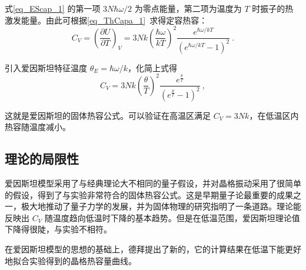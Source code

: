 式\autoref{eq_EScap_1} 的第一项 $3N \hbar\omega/2$ 为零点能量，第二项为温度为 $T$ 时振子的热激发能量。由此可根据\autoref{eq_ThCapa_1}~求得定容热容：
\begin{equation}
C_V=\left(\frac{\partial U}{\partial T}\right)_V=3Nk\left(\frac{\hbar \omega}{kT}\right)^2\frac{e^{\hbar \omega/kT}}{(e^{\hbar \omega/kT}-1)^2}~.
\end{equation}

引入爱因斯坦特征温度 $\theta_E=\hbar\omega/k$，化简上式得
\begin{equation}\label{eq_EScap_2}
C_V=3Nk\left(\frac{\theta}{T}\right)^2\frac{e^{\frac{\theta}{T}}}{(e^{\frac{\theta}{T}}-1)^2}~,
\end{equation}

这就是爱因斯坦的固体热容公式。可以验证在高温区满足 $C_V=3Nk$，在低温区内热容随温度减小。

\subsection{理论的局限性}
爱因斯坦模型采用了与经典理论大不相同的量子假设，并对晶格振动采用了很简单的假设，得到了与实验非常符合的固体热容公式。这是早期量子论最重要的成果之一，极大地推动了量子力学的发展，并为固体物理的研究指明了一条道路。理论能反映出 $C_V$ 随温度趋向低温时下降的基本趋势。但是在低温范围，爱因斯坦理论值下降得很陡，与实验不相符。

在爱因斯坦模型的思想的基础上，德拜提出了新的，它的计算结果在低温下能更好地拟合实验得到的晶格热容量曲线。
